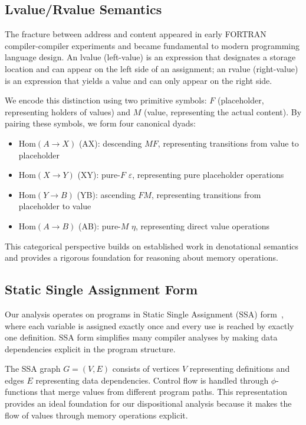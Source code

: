 \documentclass[journal]{IEEEtran}
\begin{document}
\subsection{Lvalue/Rvalue Semantics}

The fracture between address and content appeared in early FORTRAN compiler-compiler experiments and became fundamental to modern programming language design. An lvalue (left-value) is an expression that designates a storage location and can appear on the left side of an assignment; an rvalue (right-value) is an expression that yields a value and can only appear on the right side.

We encode this distinction using two primitive symbols: $F$ (placeholder, representing holders of values) and $M$ (value, representing the actual content). By pairing these symbols, we form four canonical dyads:

\begin{itemize}
\item $\text{Hom}(A\to X)$ (AX): descending $MF$, representing transitions from value to placeholder
\item $\text{Hom}(X\to Y)$ (XY): pure-$F$ $\varepsilon$, representing pure placeholder operations
\item $\text{Hom}(Y\to B)$ (YB): ascending $FM$, representing transitions from placeholder to value
\item $\text{Hom}(A\to B)$ (AB): pure-$M$ $\eta$, representing direct value operations
\end{itemize}

This categorical perspective builds on established work in denotational semantics and provides a rigorous foundation for reasoning about memory operations.

\subsection{Static Single Assignment Form}

Our analysis operates on programs in Static Single Assignment (SSA) form~\cite{cytron1991efficiently}, where each variable is assigned exactly once and every use is reached by exactly one definition. SSA form simplifies many compiler analyses by making data dependencies explicit in the program structure.

The SSA graph $G = (V, E)$ consists of vertices $V$ representing definitions and edges $E$ representing data dependencies. Control flow is handled through $\phi$-functions that merge values from different program paths. This representation provides an ideal foundation for our dispositional analysis because it makes the flow of values through memory operations explicit.
\end{document}
